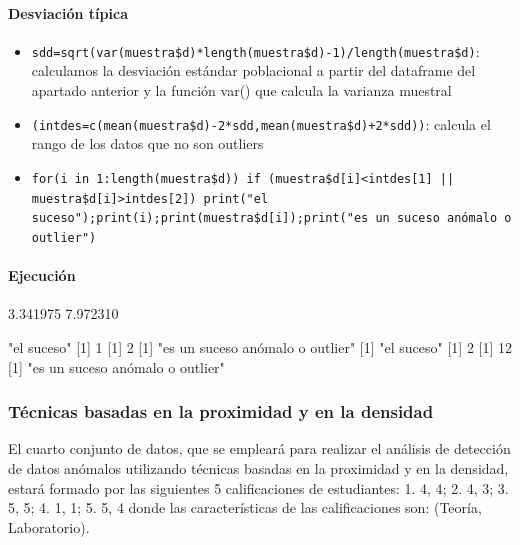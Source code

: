 \documentclass[a4paper, 12pt]{article}
\begin{document}
	\paragraph{Desviación típica}
	\begin{itemize}
		\item \texttt{sdd=sqrt(var(muestra\$d)*length(muestra\$d)-1)/length(muestra\$d)}: calculamos la desviación estándar poblacional a partir del dataframe del apartado anterior y la función var() que calcula la varianza muestral
		\item \texttt{(intdes=c(mean(muestra\$d)-2*sdd,mean(muestra\$d)+2*sdd))}: calcula el rango de los datos que no son outliers
		\item \texttt{for(i in 1:length(muestra\$d)) {if (muestra\$d[i]<intdes[1] || \\ muestra\$d[i]>intdes[2]) {print("el suceso");print(i);print(muestra\$d[i]);print("es un suceso anómalo o outlier")}}}
	\end{itemize}
	\paragraph{Ejecución}
\begin{Schunk}
\begin{Soutput}
[1] 3.341975 7.972310
\end{Soutput}
\begin{Soutput}
[1] "el suceso"
[1] 1
[1] 2
[1] "es un suceso anómalo o outlier"
[1] "el suceso"
[1] 2
[1] 12
[1] "es un suceso anómalo o outlier"
\end{Soutput}
\end{Schunk}
	\subsubsection{Técnicas basadas en la proximidad y en la densidad}
	El cuarto conjunto de datos, que se empleará para realizar el análisis de detección de datos anómalos utilizando técnicas basadas en la proximidad y en la densidad, estará formado por las siguientes 5 calificaciones de estudiantes: 1. {4, 4}; 2. {4, 3}; 3. {5, 5}; 4. {1, 1}; 5. {5, 4} donde las características de las calificaciones son: (Teoría, Laboratorio).
	
\end{document}
